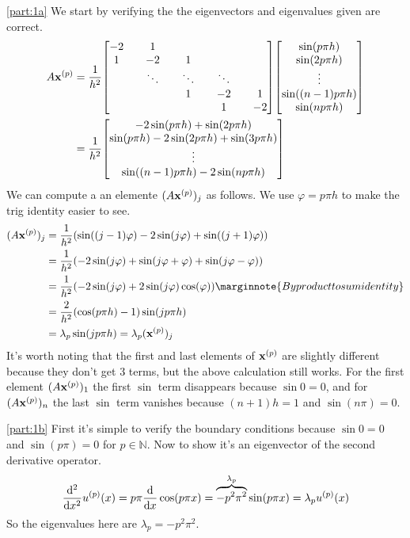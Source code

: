 \documentclass[boxes]{homework}
\begin{document}
\begin{solution}
	\ref{part:1a}
	We start by verifying the the eigenvectors and eigenvalues given are correct.
	\begin{align*}
		A\vb{x}^{(p)} &= \frac{1}{h^2}\mqty[-2 && 1 && && && \\ 1 && -2 && 1 && && \\ && \ddots && \ddots && \ddots && \\ && && 1 && -2&&1\\ && && && 1&& -2]\mqty[\sin(p\pi h) \\ \sin(2p\pi h) \\ \vdots \\ \sin((n - 1)p\pi h) \\ \sin(np\pi h)] \\
		&= \frac{1}{h^2}\mqty[-2\sin(p\pi h) + \sin(2p\pi h) \\ \sin(p\pi h) - 2\sin(2p\pi h) + \sin(3p\pi h) \\ \vdots \\ \sin((n-1)p\pi h) - 2\sin(np\pi h)]
	\end{align*}
	We can compute a an elemente $(A\vb{x}^{(p)})_j$ as follows. We use $\varphi = p\pi h$ to make the trig identity easier to see.
	\begin{align*}
		(A\vb{x}^{(p)})_j & = \frac{1}{h^2}\qty(\sin((j - 1)\varphi) - 2\sin(j\varphi) + \sin((j + 1)\varphi))                           \\
		                  & = \frac{1}{h^2}\qty(-2\sin(j\varphi) + \sin(j\varphi + \varphi) + \sin(j\varphi - \varphi))                  \\
		                  & = \frac{1}{h^2}\qty(-2\sin(j\varphi) + 2\sin(j\varphi)\cos(\varphi)) \marginnote{By product to sum identity} \\
		                  & = \frac{2}{h^2}\qty(\cos(p\pi h) - 1)\sin(jp\pi h)                                                           \\
		                  & = \lambda_p\sin(jp\pi h) = \lambda_p(\vb{x}^{(p)})_j
	\end{align*}
	It's worth noting that the first and last elements of $\vb{x}^{(p)}$ are slightly different because they don't get 3 terms, but the above calculation still works. For the first element $(A\vb{x}^{(p)})_1$ the first $\sin$ term disappears because $\sin 0 = 0$, and for $(A\vb{x}^{(p)})_n$ the last $\sin$ term vanishes because $(n+1)h = 1$ and $\sin(n\pi) = 0$.

	\ref{part:1b}
	First it's simple to verify the boundary conditions because $\sin 0 = 0$ and $\sin(p\pi) = 0$ for $p\in\mathbb{N}$. Now to show it's an eigenvector of the second derivative operator.
	\begin{equation*}
		\dv[2]{x}u^{(p)}(x) = p\pi\dv{x}\cos(p\pi x) = \overbrace{-p^2\pi^2}^{\lambda_p}\sin(p\pi x) = \lambda_pu^{(p)}(x)
	\end{equation*}
	So the eigenvalues here are $\lambda_p = -p^2\pi^2$.


\end{solution}
\end{document}
